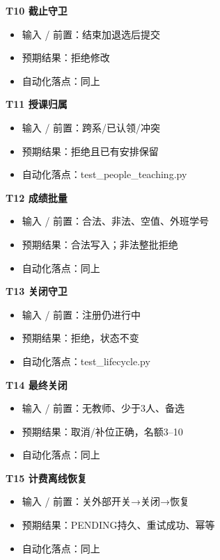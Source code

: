 \documentclass[UTF8,11pt,a4paper]{ctexart}
\providecommand{\tightlist}{\setlength{\itemsep}{0pt}\setlength{\parskip}{0pt}}
\begin{document}
\textbf{T10 截止守卫}

\begin{itemize}
\tightlist
\item
  输入 / 前置：结束加退选后提交
\item
  预期结果：拒绝修改
\item
  自动化落点：同上
\end{itemize}

\textbf{T11 授课归属}

\begin{itemize}
\tightlist
\item
  输入 / 前置：跨系/已认领/冲突
\item
  预期结果：拒绝且已有安排保留
\item
  自动化落点：test\_\allowbreak{}people\_\allowbreak{}teaching.py
\end{itemize}

\textbf{T12 成绩批量}

\begin{itemize}
\tightlist
\item
  输入 / 前置：合法、非法、空值、外班学号
\item
  预期结果：合法写入；非法整批拒绝
\item
  自动化落点：同上
\end{itemize}

\textbf{T13 关闭守卫}

\begin{itemize}
\tightlist
\item
  输入 / 前置：注册仍进行中
\item
  预期结果：拒绝，状态不变
\item
  自动化落点：test\_\allowbreak{}lifecycle.py
\end{itemize}

\textbf{T14 最终关闭}

\begin{itemize}
\tightlist
\item
  输入 / 前置：无教师、少于3人、备选
\item
  预期结果：取消/补位正确，名额3--10
\item
  自动化落点：同上
\end{itemize}

\textbf{T15 计费离线恢复}

\begin{itemize}
\tightlist
\item
  输入 / 前置：关外部开关→关闭→恢复
\item
  预期结果：PENDING持久、重试成功、幂等
\item
  自动化落点：同上
\end{itemize}
\end{document}
